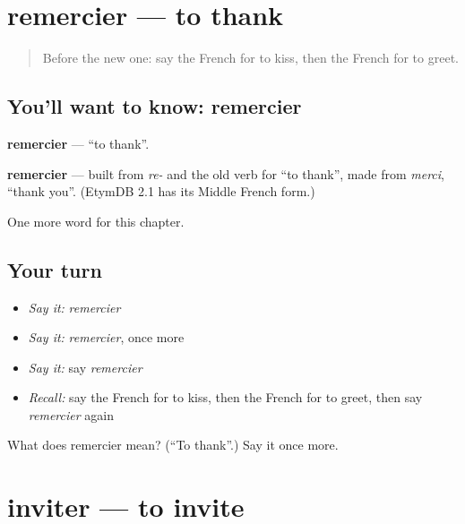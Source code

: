 \section[remercier]{remercier — to thank}

\label{lesson:FR-C175-remercier}



\begin{quote}
Before the new one: say the French for to kiss, then the French for to greet.
\end{quote}

\subsection*{You'll want to know: remercier}
\textbf{remercier} — \textquotedblleft{}to thank\textquotedblright{}.

\begin{cousinweb}
\textbf{remercier} — built from \emph{re-} and the old verb for \textquotedblleft{}to thank\textquotedblright{}, made from \emph{merci}, \textquotedblleft{}thank you\textquotedblright{}. (EtymDB 2.1 has its Middle French form.)
\end{cousinweb}

\begin{grammarlens}[title={What you've built}]
One more word for this chapter.
\end{grammarlens}

\subsection*{Your turn}
\begin{itemize}
\raggedright
  \item \emph{Say it:} \emph{remercier}
  \item \emph{Say it:} \emph{remercier}, once more
  \item \emph{Say it:} say \emph{remercier}
  \item \emph{Recall:} say the French for to kiss, then the French for to greet, then say \emph{remercier} again
\end{itemize}

\begin{tcolorbox}[breakable,colback=teal!4,colframe=teal!35!black,title={Before you move on}]
What does remercier mean? (\textquotedblleft{}To thank\textquotedblright{}.) Say it once more.
\end{tcolorbox}
\section[inviter]{inviter — to invite}

